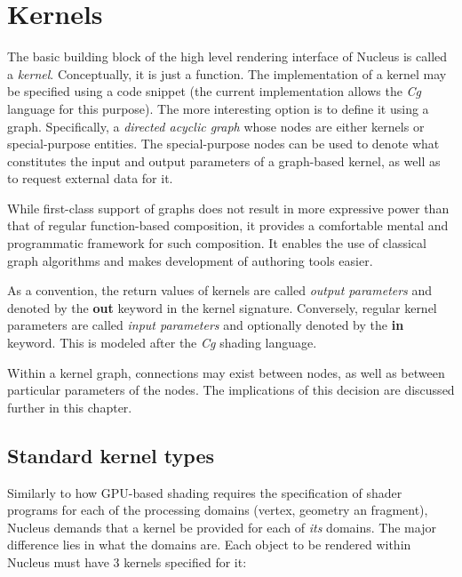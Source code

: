 \section{Kernels}
\label{sec:Kernels}

The basic building block of the high level rendering interface of Nucleus is called a \emph{kernel}. Conceptually, it is just a function. The implementation of a kernel may be specified using a code snippet (the current implementation allows the \emph{Cg} language for this purpose). The more interesting option is to define it using a graph. Specifically, a \emph{directed acyclic graph} whose nodes are either kernels or special-purpose entities. The special-purpose nodes can be used to denote what constitutes the input and output parameters of a graph-based kernel, as well as to request external data for it.

While first-class support of graphs does not result in more expressive power than that of regular function-based composition, it provides a comfortable mental and programmatic framework for such composition. It enables the use of classical graph algorithms and makes development of authoring tools easier.

As a convention, the return values of kernels are called \emph{output parameters} and denoted by the \textbf{out} keyword in the kernel signature. Conversely, regular kernel parameters are called \emph{input parameters} and optionally denoted by the \textbf{in} keyword. This is modeled after the \emph{Cg} shading language.

Within a kernel graph, connections may exist between nodes, as well as between particular parameters of the nodes. The implications of this decision are discussed further in this chapter.

\subsection{Standard kernel types}

Similarly to how GPU-based shading requires the specification of shader programs for each of the processing domains (vertex, geometry an fragment), Nucleus demands that a kernel be provided for each of \emph{its} domains. The major difference lies in what the domains are. Each object to be rendered within Nucleus must have 3 kernels specified for it:

